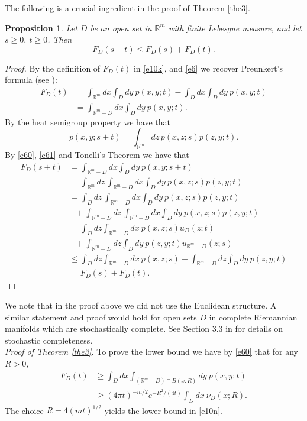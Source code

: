 \documentclass[a4paper,9pt]{amsart}
\newtheorem{proposition}[theorem]{Proposition}
\begin{document}
The following is a crucial ingredient in the proof of Theorem \ref{the3}.
\begin{proposition}
Let $D$ be an open set in ${\mathbb{R}}^m$ with finite Lebesgue measure, and
let $s\ge0,\ t\ge0$. Then
\begin{equation}\label{e59}
F_D(s+t)\le F_D(s)+F_D(t).
\end{equation}
\end{proposition}
\begin{proof} By the definition of $F_D(t)$ in \eqref{e10k}, and
\eqref{e6} we recover Preunkert's formula (see \cite{mP03}):
\begin{align}\label{e60}
F_D(t)&= \int_{{\mathbb{R}}^m}dx \int_D dy\ p(x,y;t)-\int_Ddx \int_Ddy\
p(x,y;t)\nonumber \\ &=\int_{{\mathbb{R}}^m-D}dx\int_Ddy\ p(x,y;t).
\end{align}
By the heat semigroup property we have that
\begin{equation}\label{e61}
p(x,y;s+t)=\int_{{\mathbb{R}}^m}dz \, p(x,z;s)p(z,y;t).
\end{equation}
By \eqref{e60}, \eqref{e61} and Tonelli's Theorem we have that
\begin{align*}
F_D(s+t)&=\int_{{\mathbb{R}}^m-D}dx\int_Ddy\ p(x,y;s+t) \\ &=
\int_{{\mathbb{R}}^m}dz \,\int_{{\mathbb{R}}^m-D}dx\int_Ddy\ p(x,z;s)p(z,y;t)
\\ &=\int_{D}dz \,\int_{{\mathbb{R}}^m-D}dx\int_Ddy\
p(x,z;s)p(z,y;t) \\ &\ \ \ +\int_{{\mathbb{R}}^m-D}dz
\,\int_{{\mathbb{R}}^m-D}dx\int_Ddy\ p(x,z;s)p(z,y;t) \\
&=\int_Ddz\int_{{\mathbb{R}}^m-D}dx\ p(x,z;s)u_D(z;t) \\ &\ \ \ +
\int_{{\mathbb{R}}^m-D}dz\int_Ddy\ p(z,y;t)u_{{\mathbb{R}}^{m} - D}(z;s) \\
&\le\int_Ddz\int_{{\mathbb{R}}^m-D}dx\ p(x,z;s)+\int_{{\mathbb{R}}^m-D}dz\int_Ddy\
p(z,y;t) \\ &=F_D(s)+F_D(t).
\end{align*}
\end{proof}
We note that in the proof above we did not use the Euclidean
structure. A similar statement and proof would hold for open sets
$D$ in complete Riemannian manifolds which are stochastically
complete. See Section 3.3 in  \cite{Gr} for details on stochastic
completeness.
\\[5pt]
\emph{Proof of Theorem \ref{the3}.} To prove the lower bound we
have by \eqref{e60} that for any $R>0$,
\begin{align*}
F_D(t)&\ge \int_Ddx\int_{({\mathbb{R}}^m-D)\cap B(x:R)}dy\ p(x,y;t)\nonumber
\\ & \geq(4\pi t)^{-m/2}e^{-R^2/(4t)}\int_Ddx\ \nu_D(x;R).
\end{align*}
The choice $R=4(mt)^{1/2}$ yields the lower bound in \eqref{e10n}.
\end{document}
